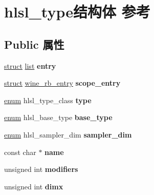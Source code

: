\hypertarget{structhlsl__type}{}\section{hlsl\+\_\+type结构体 参考}
\label{structhlsl__type}
\subsection*{Public 属性}
\begin{DoxyCompactItemize}
\item 
\mbox{\label{structhlsl__type_abac66b256bb7d54158efb3373ac7e618}} 
\hyperlink{interfacestruct}{struct} \hyperlink{classlist}{list} {\bfseries entry}
\item 
\mbox{\label{structhlsl__type_a7bb904cefbfa8f8f1091a87f32777775}} 
\hyperlink{interfacestruct}{struct} \hyperlink{structwine__rb__entry}{wine\+\_\+rb\+\_\+entry} {\bfseries scope\+\_\+entry}
\item 
\mbox{\label{structhlsl__type_ab1e269eade32086563532ae1be869feb}} 
\hyperlink{interfaceenum}{enum} hlsl\+\_\+type\+\_\+class {\bfseries type}
\item 
\mbox{\label{structhlsl__type_a5cc0425188daa239473a15c71e96d321}} 
\hyperlink{interfaceenum}{enum} hlsl\+\_\+base\+\_\+type {\bfseries base\+\_\+type}
\item 
\mbox{\label{structhlsl__type_a8f4e6750c118c83cf8b98079aca0d4d4}} 
\hyperlink{interfaceenum}{enum} hlsl\+\_\+sampler\+\_\+dim {\bfseries sampler\+\_\+dim}
\item 
\mbox{\label{structhlsl__type_aa1e43a0fce32e62b8ea84dd8428d8551}} 
const char $\ast$ {\bfseries name}
\item 
\mbox{\label{structhlsl__type_a7b76d7478314a09e5068dd02770a5ea3}} 
unsigned int {\bfseries modifiers}
\item 
\mbox{\label{structhlsl__type_a02c80e2b57b89c8042e52e0dcf2103cf}} 
unsigned int {\bfseries dimx}
\item 
\mbox{\label{structhlsl__type_af6473bb4224ea96aebf875a61dbf4513}} 

\end{DoxyCompactItemize}
